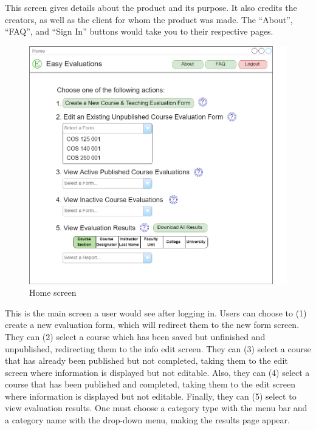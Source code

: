 \documentclass{article}
\begin{document}
This screen gives details about the product and its purpose. It also credits the creators, as well as the client for whom the product was made. The ``About'', ``FAQ'', and ``Sign In'' buttons would take you to their respective pages.

\newpage

\begin{center}
\begin{figure}[H]
    \centering
    \caption{Home screen}
    \includegraphics[width=6.5in]{images/home_screen.png}
\end{figure}
\end{center}

This is the main screen a user would see after logging in. Users can choose to (1) create a new evaluation form, which will redirect them to the new form screen. They can (2) select a course which has been saved but unfinished and unpublished, redirecting them to the info edit screen. They can (3) select a course that has already been published but not completed, taking them to the edit screen where information is displayed but not editable. Also, they can  (4) select a course that has been published and completed, taking them to the edit screen where information is displayed but not editable. Finally, they can (5) select to view evaluation results. One must choose a category type with the menu bar and a category name with the drop-down menu, making the results page appear.
\end{document}
